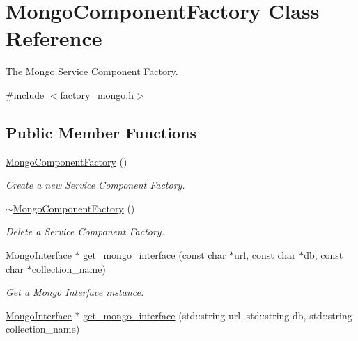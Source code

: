\hypertarget{classMongoComponentFactory}{}\section{Mongo\+Component\+Factory Class Reference}
\label{classMongoComponentFactory}


The Mongo Service Component Factory.  




{\ttfamily \#include $<$factory\+\_\+mongo.\+h$>$}

\subsection*{Public Member Functions}
\begin{DoxyCompactItemize}
\item 
\hyperlink{classMongoComponentFactory_ad98b89af9397105639e36f985d368f21}{Mongo\+Component\+Factory} ()\hypertarget{classMongoComponentFactory_ad98b89af9397105639e36f985d368f21}{}\label{classMongoComponentFactory_ad98b89af9397105639e36f985d368f21}

\begin{DoxyCompactList}\small\item\em Create a new Service Component Factory. \end{DoxyCompactList}\item 
\hyperlink{classMongoComponentFactory_a861f52374272dc439fcee8d3de2e09ee}{$\sim$\+Mongo\+Component\+Factory} ()\hypertarget{classMongoComponentFactory_a861f52374272dc439fcee8d3de2e09ee}{}\label{classMongoComponentFactory_a861f52374272dc439fcee8d3de2e09ee}

\begin{DoxyCompactList}\small\item\em Delete a Service Component Factory. \end{DoxyCompactList}\item 
\hyperlink{classMongoInterface}{Mongo\+Interface} $\ast$ \hyperlink{classMongoComponentFactory_a67388e5603e265ddfe0246d6726baf24}{get\+\_\+mongo\+\_\+interface} (const char $\ast$url, const char $\ast$db, const char $\ast$collection\+\_\+name)\hypertarget{classMongoComponentFactory_a67388e5603e265ddfe0246d6726baf24}{}\label{classMongoComponentFactory_a67388e5603e265ddfe0246d6726baf24}

\begin{DoxyCompactList}\small\item\em Get a Mongo Interface instance. \end{DoxyCompactList}\item 
\hyperlink{classMongoInterface}{Mongo\+Interface} $\ast$ \hyperlink{classMongoComponentFactory_a95778473e6c83acae99e3c27155ab5fd}{get\+\_\+mongo\+\_\+interface} (std\+::string url, std\+::string db, std\+::string collection\+\_\+name)\hypertarget{classMongoComponentFactory_a95778473e6c83acae99e3c27155ab5fd}{}\label{classMongoComponentFactory_a95778473e6c83acae99e3c27155ab5fd}


\end{DoxyCompactItemize}
